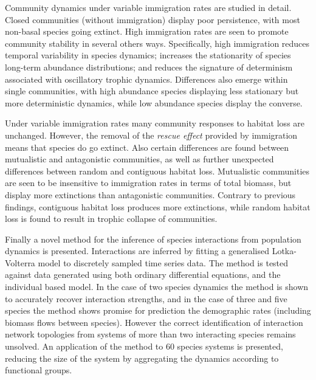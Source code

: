\begin{SingleSpace}
Community dynamics under variable immigration rates are studied in detail. Closed communities (without immigration) display poor persistence, with most non-basal species going extinct. High immigration rates are seen to promote community stability in several others ways. Specifically, high immigration reduces temporal variability in species dynamics; increases the stationarity of species long-term abundance distributions; and reduces the signature of determinism associated with oscillatory trophic dynamics. Differences also emerge within single communities, with high abundance species displaying less stationary but more deterministic dynamics, while low abundance species display the converse. 

Under variable immigration rates many community responses to habitat loss are unchanged. However, the removal of the \emph{rescue effect} provided by immigration means that species do go extinct. Also certain differences are found between mutualistic and antagonistic communities, as well as further unexpected differences between random and contiguous habitat loss. Mutualistic communities are seen to be insensitive to immigration rates in terms of total biomass, but display more extinctions than antagonistic communities. Contrary to previous findings, contiguous habitat loss produces more extinctions, while random habitat loss is found to result in trophic collapse of communities. 

Finally a novel method for the inference of species interactions from population dynamics is presented. Interactions are inferred by fitting a generalised Lotka-Volterra model to discretely sampled time series data. The method is tested against data generated using both ordinary differential equations, and the individual based model. In the case of two species dynamics the method is shown to accurately recover interaction strengths, and in the case of three and five species the method shows promise for prediction the demographic rates (including biomass flows between species). However the correct identification of interaction network topologies from systems of more than two interacting species remains unsolved. An application of the method to 60 species systems is presented, reducing the size of the system by aggregating the dynamics according to functional groups.   

\end{SingleSpace}
\clearpage